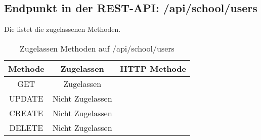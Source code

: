 \subsection{Endpunkt in der REST-API: /api/school/users}
Die  listet die zugelassenen Methoden. 

\begin{table}[!htbp]
	\begin{tabular}{|c|c|c|}
		\hline
			\textbf{Methode} & \textbf{Zugelassen} & \textbf{HTTP Methode} \\ \hline
			GET & Zugelassen &  \\ \hline
			UPDATE & Nicht Zugelassen & \\ \hline 
			CREATE & Nicht Zugelassen & \\ \hline 
			DELETE & Nicht Zugelassen & \\ \hline
	\end{tabular}

		\caption{Zugelassen Methoden auf /api/school/users}
		\label{tab:end:rest:api:school:users:meth}
\end{table}



